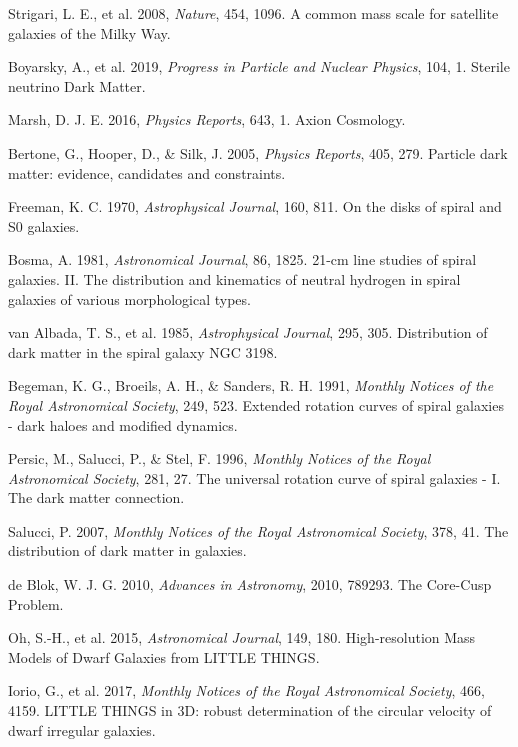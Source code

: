 \documentclass[12pt,a4paper]{article}
\begin{document}
\begin{thebibliography}{99}
 Strigari, L. E., et al. 2008, \textit{Nature}, 454, 1096. A common mass scale for satellite galaxies of the Milky Way.

 Boyarsky, A., et al. 2019, \textit{Progress in Particle and Nuclear Physics}, 104, 1. Sterile neutrino Dark Matter.

 Marsh, D. J. E. 2016, \textit{Physics Reports}, 643, 1. Axion Cosmology.

 Bertone, G., Hooper, D., \& Silk, J. 2005, \textit{Physics Reports}, 405, 279. Particle dark matter: evidence, candidates and constraints.

 Freeman, K. C. 1970, \textit{Astrophysical Journal}, 160, 811. On the disks of spiral and S0 galaxies.

 Bosma, A. 1981, \textit{Astronomical Journal}, 86, 1825. 21-cm line studies of spiral galaxies. II. The distribution and kinematics of neutral hydrogen in spiral galaxies of various morphological types.

 van Albada, T. S., et al. 1985, \textit{Astrophysical Journal}, 295, 305. Distribution of dark matter in the spiral galaxy NGC 3198.

 Begeman, K. G., Broeils, A. H., \& Sanders, R. H. 1991, \textit{Monthly Notices of the Royal Astronomical Society}, 249, 523. Extended rotation curves of spiral galaxies - dark haloes and modified dynamics.

 Persic, M., Salucci, P., \& Stel, F. 1996, \textit{Monthly Notices of the Royal Astronomical Society}, 281, 27. The universal rotation curve of spiral galaxies - I. The dark matter connection.

 Salucci, P. 2007, \textit{Monthly Notices of the Royal Astronomical Society}, 378, 41. The distribution of dark matter in galaxies.

 de Blok, W. J. G. 2010, \textit{Advances in Astronomy}, 2010, 789293. The Core-Cusp Problem.

 Oh, S.-H., et al. 2015, \textit{Astronomical Journal}, 149, 180. High-resolution Mass Models of Dwarf Galaxies from LITTLE THINGS.

 Iorio, G., et al. 2017, \textit{Monthly Notices of the Royal Astronomical Society}, 466, 4159. LITTLE THINGS in 3D: robust determination of the circular velocity of dwarf irregular galaxies.


\end{thebibliography}
\end{document}
